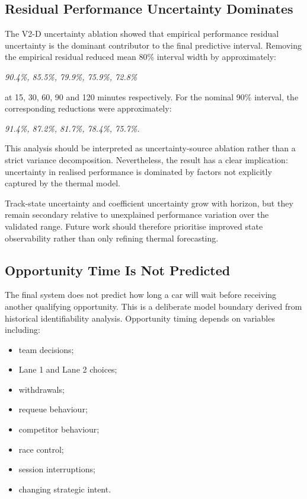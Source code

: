 \subsection{Residual Performance Uncertainty Dominates}
The V2-D uncertainty ablation showed that empirical performance residual uncertainty is the dominant contributor to the final predictive interval. Removing the empirical residual reduced mean 80\% interval width by approximately:

\begin{center}\textit{90.4\%, 85.5\%, 79.9\%, 75.9\%, 72.8\%}\end{center}

at 15, 30, 60, 90 and 120 minutes respectively. For the nominal 90\% interval, the corresponding reductions were approximately:

\begin{center}\textit{91.4\%, 87.2\%, 81.7\%, 78.4\%, 75.7\%.}\end{center}

This analysis should be interpreted as uncertainty-source ablation rather than a strict variance decomposition. Nevertheless, the result has a clear implication: uncertainty in realised performance is dominated by factors not explicitly captured by the thermal model.

Track-state uncertainty and coefficient uncertainty grow with horizon, but they remain secondary relative to unexplained performance variation over the validated range. Future work should therefore prioritise improved state observability rather than only refining thermal forecasting.

\subsection{Opportunity Time Is Not Predicted}
The final system does not predict how long a car will wait before receiving another qualifying opportunity. This is a deliberate model boundary derived from historical identifiability analysis. Opportunity timing depends on variables including:

\begin{itemize}
\item team decisions;
\item Lane 1 and Lane 2 choices;
\item withdrawals;
\item requeue behaviour;
\item competitor behaviour;
\item race control;
\item session interruptions;
\item changing strategic intent.
\end{itemize}


